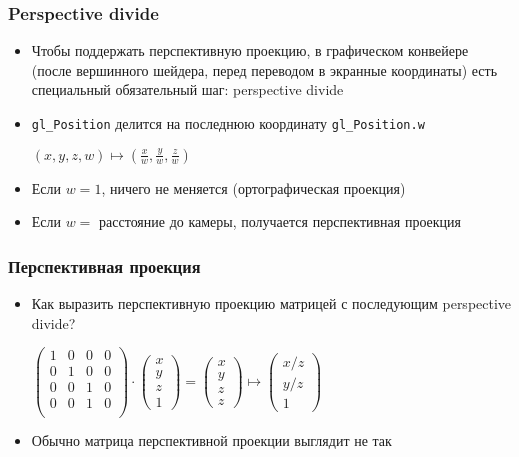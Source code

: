 \documentclass{beamer}
\begin{document}
\begin{frame}[fragile]
\frametitle{Perspective divide}
\begin{itemize}
\item Чтобы поддержать перспективную проекцию, в графическом конвейере (после вершинного шейдера, перед переводом в экранные координаты) есть специальный обязательный шаг: perspective divide
\pause
\item \verb|gl_Position| делится на последнюю координату \verb|gl_Position.w|
\begin{center}
\begin{math}
(x, y, z, w) \mapsto \left(\frac{x}{w}, \frac{y}{w}, \frac{z}{w}\right)
\end{math}
\end{center}
\pause
\item Если \begin{math}w=1\end{math}, ничего не меняется (ортографическая проекция)
\pause
\item Если \begin{math}w=\end{math} расстояние до камеры, получается перспективная проекция
\end{itemize}
\end{frame}

\begin{frame}[fragile]
\frametitle{Перспективная проекция}
\begin{itemize}
\item Как выразить перспективную проекцию матрицей с последующим perspective divide?
\pause
\begin{center}
\begin{math}
\begin{pmatrix}
1 & 0 & 0 & 0 \\
0 & 1 & 0 & 0 \\
0 & 0 & 1 & 0 \\
0 & 0 & 1 & 0 \\
\end{pmatrix}
\cdot
\begin{pmatrix}
x \\ y \\ z \\ 1
\end{pmatrix}
=
\begin{pmatrix}
x \\ y \\ z \\ z
\end{pmatrix}
\mapsto
\begin{pmatrix}
x/z \\ y/z \\ 1
\end{pmatrix}
\end{math}
\end{center}
\pause
\item Обычно матрица перспективной проекции выглядит не так
\end{itemize}
\end{frame}
\end{document}
